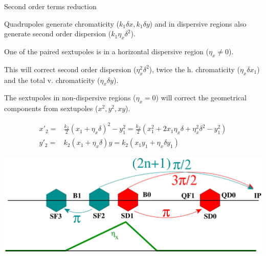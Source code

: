 \documentclass{beamer}
\begin{document}
\begin{frame}{Second order terms reduction}\,
  {\scriptsize Quadrupoles generate chromaticity ($k_1 \delta x, k_1 \delta y$) and in dispersive regions also generate second order dispersion ($k_1\eta_x\delta^2$).\par
  One of the paired sextupoles is in a horizontal dispersive region ($\eta_x\neq0$).\par
  This will correct second order dispersion ($\eta_x^2\delta^2$), twice the h. chromaticity ($\eta_x\delta x_1$) and the total v. chromaticity ($\eta_x\delta y$).\par
  The sextupoles in non-dispersive regions ($\eta_x=0$) will correct the geometrical components from sextupoles ($x^2, y^2, xy$).\par
  }
  \begin{align*}
   x'_2 = & \frac{k_2}{2}(x_1+\eta_x\delta)^2-y_1^2=\frac{k_2}{2}(x_1^2+2x_1\eta_x\delta+\eta_x^2\delta^2-y_1^2)\\
   y'_2 = & k_2 (x_1+\eta_x\delta)y = k_2 (x_1y_1 +\eta_x\delta y_1)
  \end{align*}

 \includegraphics[scale=0.20,angle=0]{phase_adv.pdf}\par
\end{frame}
\end{document}
